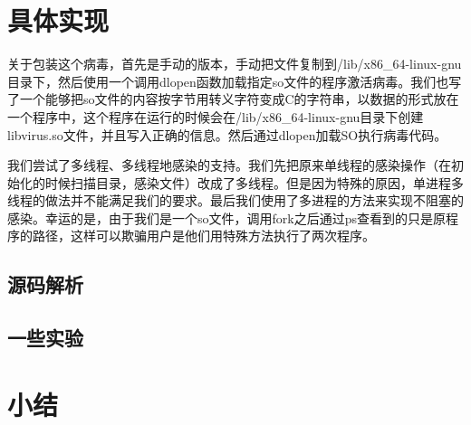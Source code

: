 \documentclass[11pt]{article}
\begin{document}
\section{具体实现}
关于包装这个病毒，首先是手动的版本，手动把文件复制到/lib/x86\_64-linux-gnu目录下，然后使用一个调用dlopen函数加载指定so文件的程序激活病毒。我们也写了一个能够把so文件的内容按字节用转义字符变成C的字符串，以数据的形式放在一个程序中，这个程序在运行的时候会在/lib/x86\_64-linux-gnu目录下创建libvirus.so文件，并且写入正确的信息。然后通过dlopen加载SO执行病毒代码。

我们尝试了多线程、多线程地感染的支持。我们先把原来单线程的感染操作（在初始化的时候扫描目录，感染文件）改成了多线程。但是因为特殊的原因，单进程多线程的做法并不能满足我们的要求。最后我们使用了多进程的方法来实现不阻塞的感染。幸运的是，由于我们是一个so文件，调用fork之后通过ps查看到的只是原程序的路径，这样可以欺骗用户是他们用特殊方法执行了两次程序。

\subsection{源码解析}

\subsection{一些实验}
\section{小结}
\end{document}
